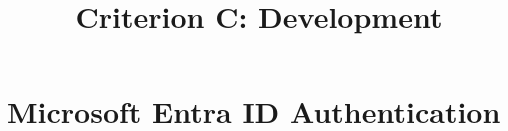 

\usepackage{xr}


\title{Criterion C: Development}


\maketitle

\tableofcontents

\section{Microsoft Entra ID Authentication}


% 
% 
% 
